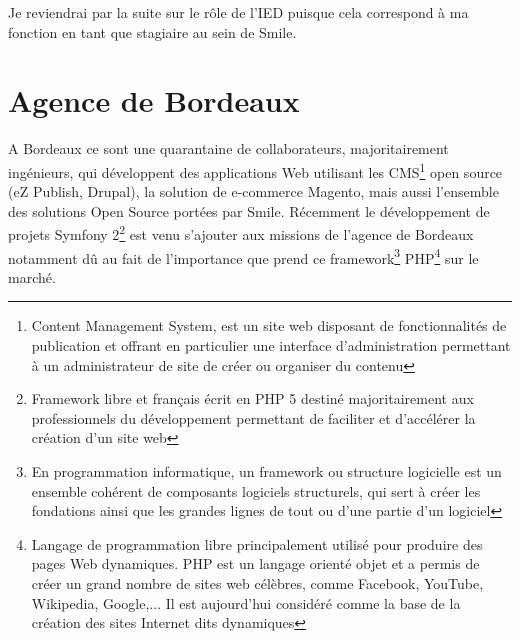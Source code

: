 \documentclass[a4paper,11pt,twoside]{report}
\begin{document}
  Je reviendrai par la suite sur le rôle de l'IED puisque cela correspond à ma fonction en tant que stagiaire au sein de Smile.
  
  \section{Agence de Bordeaux}
  A Bordeaux ce sont une quarantaine de collaborateurs, majoritairement ingénieurs, qui développent des applications Web utilisant les CMS\footnote{Content Management System, est un site web disposant de fonctionnalités de publication et offrant en particulier une interface d'administration permettant à un administrateur de site de créer ou organiser du contenu} open source (eZ Publish, Drupal), la solution de e-commerce Magento, mais aussi l’ensemble des solutions Open Source portées par Smile. Récemment le développement de projets Symfony 2\footnote{Framework libre et français écrit en PHP 5 destiné majoritairement aux professionnels du développement permettant de faciliter et d’accélérer la création d'un site web} est venu s'ajouter aux missions de l'agence de Bordeaux notamment dû au fait de l'importance que prend ce framework\footnote{En programmation informatique, un framework ou structure logicielle est un ensemble cohérent de composants logiciels structurels, qui sert à créer les fondations ainsi que les grandes lignes de tout ou d’une partie d'un logiciel} PHP\footnote{Langage de programmation libre principalement utilisé pour produire des pages Web dynamiques. PHP est un langage orienté objet et a permis de créer un grand nombre de sites web célèbres, comme Facebook, YouTube, Wikipedia, Google,... Il est aujourd'hui considéré comme la base de la création des sites Internet dits dynamiques} sur le marché.\newline
\end{document}
